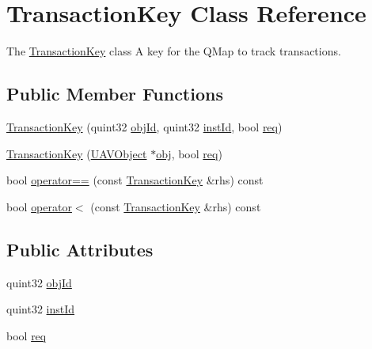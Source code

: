 \hypertarget{class_transaction_key}{\section{Transaction\-Key Class Reference}
\label{class_transaction_key}
}


The \hyperlink{class_transaction_key}{Transaction\-Key} class A key for the Q\-Map to track transactions.  


\subsection*{Public Member Functions}
\begin{DoxyCompactItemize}
\item 
\hyperlink{group___u_a_v_talk_plugin_gad570ba59a89b2499d1fa950f756f029e}{Transaction\-Key} (quint32 \hyperlink{group___u_a_v_talk_plugin_ga23b79980c6f897e84ca1b88c5bb532ad}{obj\-Id}, quint32 \hyperlink{group___u_a_v_talk_plugin_ga3d92643b78ea3e10cd9ac1ac2cc4b5f7}{inst\-Id}, bool \hyperlink{group___u_a_v_talk_plugin_gafe5007a7f451f47110150ee417594a38}{req})
\item 
\hyperlink{group___u_a_v_talk_plugin_ga01b3c8039cd97c7da26eb79fdeed0003}{Transaction\-Key} (\hyperlink{class_u_a_v_object}{U\-A\-V\-Object} $\ast$\hyperlink{glext_8h_a0c0d4701a6c89f4f7f0640715d27ab26}{obj}, bool \hyperlink{group___u_a_v_talk_plugin_gafe5007a7f451f47110150ee417594a38}{req})
\item 
bool \hyperlink{group___u_a_v_talk_plugin_ga6619fa90d68b631eef2b94302d77df19}{operator==} (const \hyperlink{class_transaction_key}{Transaction\-Key} \&rhs) const 
\item 
bool \hyperlink{group___u_a_v_talk_plugin_ga535141f4efa21d7b4b5d5314c92d1c8e}{operator$<$} (const \hyperlink{class_transaction_key}{Transaction\-Key} \&rhs) const 
\end{DoxyCompactItemize}
\subsection*{Public Attributes}
\begin{DoxyCompactItemize}
\item 
quint32 \hyperlink{group___u_a_v_talk_plugin_ga23b79980c6f897e84ca1b88c5bb532ad}{obj\-Id}
\item 
quint32 \hyperlink{group___u_a_v_talk_plugin_ga3d92643b78ea3e10cd9ac1ac2cc4b5f7}{inst\-Id}
\item 
bool \hyperlink{group___u_a_v_talk_plugin_gafe5007a7f451f47110150ee417594a38}{req}
\end{DoxyCompactItemize}


